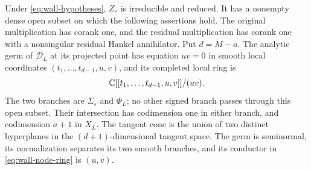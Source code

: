 \begin{theorem}\label{thm:wall-node}
Under \eqref{eq:wall-hypotheses}, $Z_\varepsilon$ is irreducible and
reduced. It has a nonempty dense open subset on which the following
assertions hold. The original multiplication has corank one, and the
residual multiplication has corank one with a nonsingular residual
Hankel annihilator. Put $d=M-a$. The analytic germ of $\mathscr D_L$ at its projected point has
equation $uv=0$ in smooth local coordinates
$(t_1,\ldots,t_{d-1},u,v)$, and its completed local ring is
\begin{equation}\label{eq:wall-node-ring}
 \mathbb C[[t_1,\ldots,t_{d-1},u,v]]/(uv).
\end{equation}
The two branches are $\Sigma_\varepsilon$ and $\Phi_L$; no other
signed branch passes through this open subset. Their intersection has
codimension one in either branch, and codimension $a+1$ in $X_L$.
The tangent cone is the union of two distinct hyperplanes in the
$(d+1)$-dimensional tangent space. The germ is seminormal, its
normalization separates its two smooth branches, and its conductor in
\eqref{eq:wall-node-ring} is $(u,v)$.
\end{theorem}

